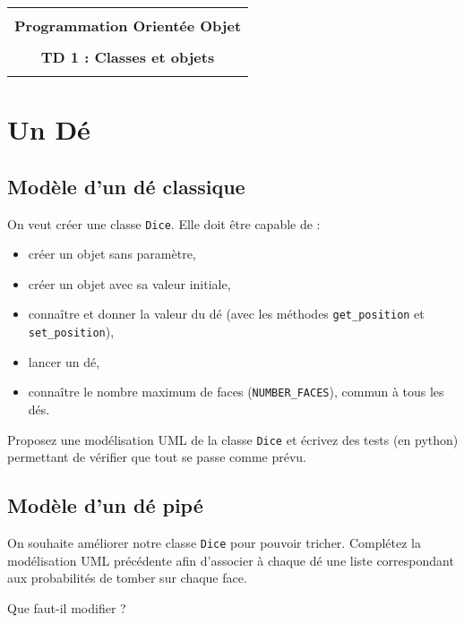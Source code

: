 \documentclass[12pt]{article}
\begin{document}
    \begin{center}
      \begin{tabular}{c}
      \hline
    \\
        {\bf \textsf {\Large Programmation Orientée Objet}}\\
    \\
        {\bf \textsf {\Large TD 1 : Classes et objets}}\\
    \\
        \hline
      \end{tabular}
    \end{center}
    \vspace{15mm}

\section{Un Dé}

\subsection{Modèle d'un dé classique}

On veut créer une classe \verb|Dice|. Elle doit être capable de :
\begin{itemize}
	\item créer un objet sans paramètre,
	\item créer un objet avec sa valeur initiale,
	\item connaître et donner la valeur du dé (avec les méthodes \verb|get_position| et \verb|set_position|),
	\item lancer un dé,
	\item connaître le nombre maximum de faces (\verb|NUMBER_FACES|), commun à tous les dés.
\end{itemize}

Proposez une modélisation UML de la classe \verb|Dice| et écrivez des tests (en python) permettant de vérifier que tout se passe comme prévu.

\subsection{Modèle d'un dé pipé}

On souhaite améliorer notre classe \verb|Dice| pour pouvoir tricher. Complétez la modélisation UML précédente afin d'associer à chaque dé une liste correspondant aux probabilités de tomber sur chaque face.

Que faut-il modifier ?
\end{document}
